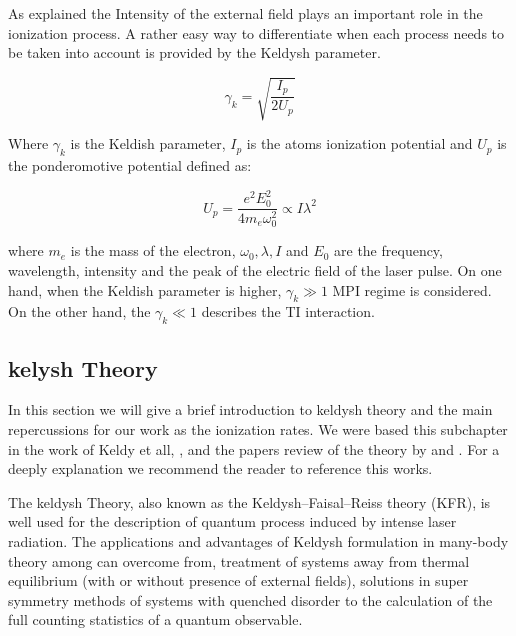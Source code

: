 As explained the Intensity of the external field plays an important role in the ionization process. A rather easy way to differentiate when each process needs to be taken into account is provided by the Keldysh parameter\cite{keldysh_ionization_1965}.

\begin{equation}
\gamma_{k}=\sqrt{\dfrac{I_{p}}{2U_{p}}}
\end{equation}

Where $\gamma_{k}$ is the Keldish parameter, $I_{p}$ is the atoms ionization potential and $U_{p}$ is the ponderomotive potential defined as:

\begin{equation}
U_{p} = \dfrac{e^{2}E_{0}^{2}}{4m_{e}\omega_{0}^{2}} \propto I \lambda^{2}
\end{equation}

where $m_{e}$ is the mass of the electron, $\omega_{0}, \lambda, I$ and $E_{0}$ are the frequency, wavelength, intensity and the peak of the electric field of the laser pulse. On one hand, when the Keldish parameter is higher, $\gamma_{k} \gg 1$ MPI regime is considered. On the other hand, the $\gamma_{k} \ll 1$ describes the TI interaction.

\subsection{kelysh Theory}

In this section we will give a brief introduction to keldysh theory and the main repercussions for our work as the ionization rates. We were based this subchapter in the work of Keldy et all, \cite{keldysh_ionization_1965}, and the papers review of the theory by \cite{popruzhenko_keldysh_2014} and \cite{karnakov_strong_2009}. For a deeply explanation we recommend the reader to reference this works.

The keldysh Theory, also known as the Keldysh–Faisal–Reiss theory (KFR),  is well used for the description of quantum process induced by intense laser radiation. The applications and advantages of Keldysh formulation in many-body theory among  can overcome from, treatment of systems away from thermal equilibrium (with or without presence of external fields), solutions in  super symmetry methods of systems with quenched disorder to the  calculation of the full counting statistics of a quantum observable\cite{kamenev_introduction_nodate}.

